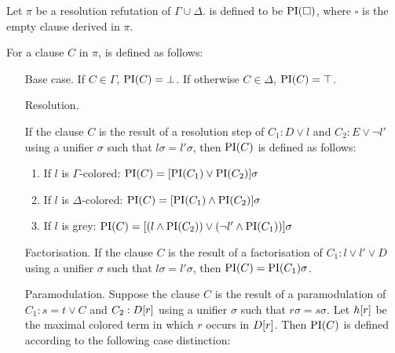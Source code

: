 \begin{defi}
	Let $\pi$ be a resolution refutation of $\Gamma \cup \Delta$.
	 is defined to be $\operatorname{PI}(\square)$, where $\square$ is the empty clause derived in $\pi$.

	For a clause $C$ in $\pi$,  is defined as follows:
	\label{def:PI}
	\begin{itemize}
		\item[Base case.]
			If $C \in \Gamma$, $\operatorname{PI}(C) = \bot$.
			If otherwise $C \in \Delta$, $\operatorname{PI}(C) = \top$.
		\item[Resolution.]
			\label{def:PI_resolution}

      If the clause $C$ is the result of a resolution step of $C_1: D \lor l$ and $C_2: E \lor \lnot l'$ using a unifier $\sigma$ such that $l\sigma = l'\sigma$, then $\operatorname{PI}(C)$ is defined as follows:
      \begin{enumerate}
        \item If $l$ is $\Gamma$-colored: $\operatorname{PI}(C) = [\operatorname{PI}(C_1) \lor \operatorname{PI}(C_2)]\sigma$
        \item If $l$ is $\Delta$-colored: $\operatorname{PI}(C) = [\operatorname{PI}(C_1) \land \operatorname{PI}(C_2)]\sigma$
        \item If $l$ is grey: $\operatorname{PI}(C) = [(l \land \operatorname{PI}(C_2)) \lor (\lnot l' \land \operatorname{PI}(C_1)) ]\sigma $
      \end{enumerate}

    \item[Factorisation.]
      If the clause $C$ is the result of a factorisation of $C_1: l \lor l' \lor D$ using a unifier $\sigma$ such that $l\sigma = l'\sigma$, then $\operatorname{PI}(C) = \operatorname{PI}(C_1)\sigma$.

    \item[Paramodulation.]
  \label{def:PI_paramod}
      Suppose the clause $C$ is the result of a paramodulation of $C_1: s=t \lor C$ and $C_2: D[r]$ using a       unifier $\sigma$ such that $r\sigma = s\sigma$.
      Let $h[r]$ be the maximal colored term in which $r$ occurs in $D[r]$.
      Then $\operatorname{PI}(C)$ is defined according to the following case distinction:
      \begin{enumerate}


\end{enumerate}
\end{itemize}
\end{defi}
